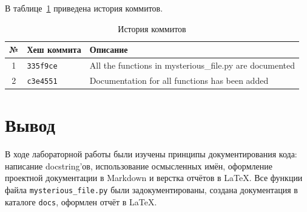 \documentclass[a4paper,12pt]{article}
\begin{document}
В таблице~\ref{tab:commits} приведена история коммитов.

\begin{table}[h]
\centering
\begin{tabular}{|c|l|l|}
\hline
\textbf{№} & \textbf{Хеш коммита} & \textbf{Описание} \\
\hline
1 & \texttt{335f9ce} & All the functions in mysterious\_file.py are documented \\
2 & \texttt{c3e4551} & Documentation for all functions has been added \\
\hline
\end{tabular}
\caption{История коммитов}
\label{tab:commits}
\end{table}

\section{Вывод}

В ходе лабораторной работы были изучены принципы документирования
кода: написание docstring'ов, использование осмысленных имён,
оформление проектной документации в Markdown и верстка отчётов
в LaTeX. Все функции файла \texttt{mysterious\_file.py} были
задокументированы, создана документация в каталоге \texttt{docs},
оформлен отчёт в LaTeX.
\end{document}

